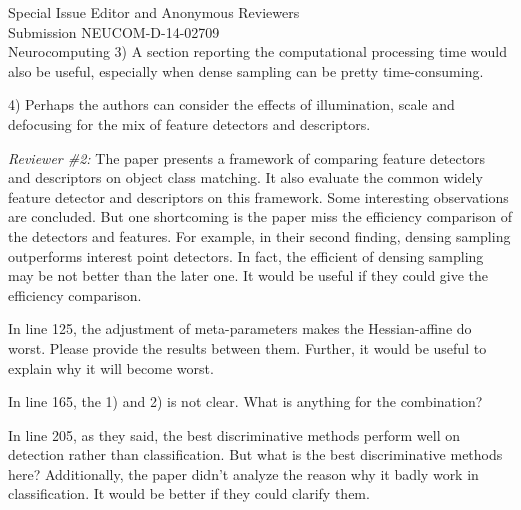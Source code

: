 \documentclass{letter}
\begin{document}
\begin{letter}{Special Issue Editor and Anonymous Reviewers\\
Submission NEUCOM-D-14-02709\\
Neurocomputing}
3)	A section reporting the computational processing time would also be useful,
especially when dense sampling can be pretty time-consuming.


4)	Perhaps the authors can consider the effects of illumination, scale and
defocusing for the mix of feature detectors and descriptors.


{\em Reviewer \#2:}
 The paper presents a framework of comparing feature detectors and descriptors
on object class matching. It also evaluate the common widely feature detector
and descriptors on this framework. Some interesting observations are concluded.
But one shortcoming is the paper miss the efficiency comparison of the
detectors and features. For example, in their second finding, densing sampling
outperforms interest point detectors. In fact, the efficient of densing
sampling may be not better than the later one. It would be useful if they could
give the efficiency comparison.


In line 125, the adjustment of meta-parameters makes the Hessian-affine do
worst. Please provide the results between them. Further, it would be useful
to explain why it will become worst.


In line 165, the 1) and 2) is not clear. What is anything for the combination?


In line 205, as they said, the best discriminative methods perform well on
detection rather than classification. But what is the best discriminative
methods here? Additionally, the paper didn't analyze the reason why it
badly work in classification. It would be better if they could clarify them.


\end{letter}
\end{document}
